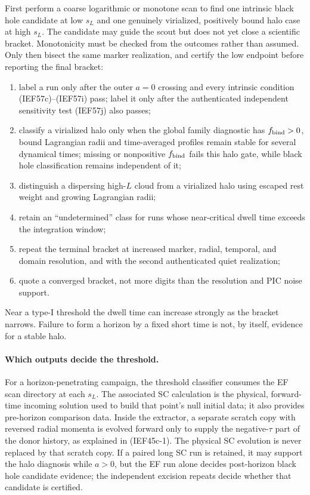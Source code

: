 First perform a coarse logarithmic or monotone scan to find one intrinsic
black hole candidate at low \(s_L\) and one genuinely virialized, positively
bound halo case at high \(s_L\).  The candidate may guide the scout but does
not yet close a scientific bracket.  Monotonicity must be checked from the
outcomes rather than assumed.  Only then bisect the same marker realization,
and certify the low endpoint before reporting the final bracket:
\begin{enumerate}
\item label a run  only after the outer \(a=0\)
      crossing and every intrinsic condition (IEF57c)--(IEF57i) pass; label it
       only after the authenticated independent
      sensitivity test (IEF57j) also passes;
\item classify a virialized halo only when the global family diagnostic has
      \(f_{\rm bind}>0\), bound Lagrangian radii and time-averaged profiles
      remain stable for several dynamical times; missing or nonpositive
      \(f_{\rm bind}\) fails this halo gate, while black hole classification
      remains independent of it;
\item distinguish a dispersing high-\(L\) cloud from a virialized halo using
      escaped rest weight and growing Lagrangian radii;
\item retain an ``undetermined'' class for runs whose near-critical dwell time
      exceeds the integration window;
\item repeat the terminal bracket at increased marker, radial, temporal, and
      domain resolution, and with the second authenticated quiet realization;
\item quote a converged bracket, not more digits than the resolution and PIC
      noise support.
\end{enumerate}
Near a type-I threshold the dwell time can increase strongly as the bracket
narrows.  Failure to form a horizon by a fixed short time is not, by itself,
evidence for a stable halo.

\paragraph{Which outputs decide the threshold.}
For a horizon-penetrating campaign, the threshold classifier consumes the EF
scan directory at each \(s_L\).  The associated SC calculation is the
physical, forward-time incoming solution used to build that point's null
initial data; it also provides pre-horizon comparison data.  Inside the
extractor, a separate scratch copy with reversed radial momenta is evolved
forward only to supply the negative-\(\tau\) part of the donor history, as
explained in (IEF45c-1).  The physical SC evolution is never replaced by that
scratch copy.  If a paired long SC run is retained, it may support the halo
diagnosis while \(a>0\), but the EF run alone decides post-horizon black hole
candidate evidence; the independent excision repeats decide whether that
candidate is certified.

